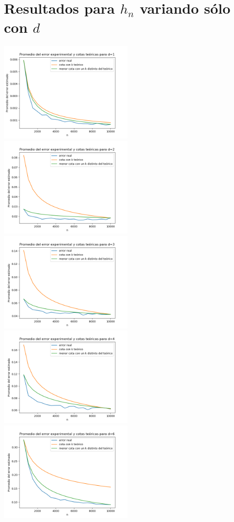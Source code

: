 \documentclass[12pt, a4paper]{article}
\begin{document}
\section{Resultados para $h_n$ variando sólo con $d$}

\includegraphics[width=0.5\textwidth]{figuras_h_semidinamico/cotas-error-d=1}
\includegraphics[width=0.5\textwidth]{figuras_h_semidinamico/cotas-error-d=2}
\includegraphics[width=0.5\textwidth]{figuras_h_semidinamico/cotas-error-d=3}
\includegraphics[width=0.5\textwidth]{figuras_h_semidinamico/cotas-error-d=4}
\includegraphics[width=0.5\textwidth]{figuras_h_semidinamico/cotas-error-d=6}
\end{document}
